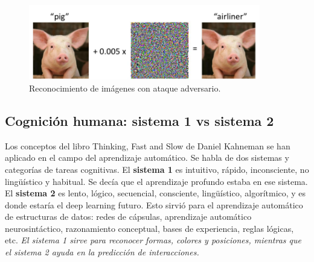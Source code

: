 \begin{figure}[htbp]
\centering
\includegraphics[width = 0.9\textwidth]{figs/pig-ai.png}
\caption{Reconocimiento de imágenes con ataque adversario.}
\label{fig:pig}
\end{figure}

\subsection{Cognición humana: sistema 1 vs sistema 2}
Los conceptos del libro Thinking, Fast and Slow de Daniel Kahneman se han aplicado en el campo del aprendizaje automático. Se habla de dos sistemas y categorías de tareas cognitivas. El \textbf{sistema 1} es intuitivo, rápido, inconsciente, no lingüístico y habitual. Se decía que el aprendizaje profundo estaba en ese sistema. El \textbf{sistema 2} es lento, lógico, secuencial, consciente, lingüístico, algorítmico, y es donde estaría el deep learning futuro. Esto sirvió para el aprendizaje automático de estructuras de datos: redes de cápsulas, aprendizaje automático neurosintáctico, razonamiento conceptual, bases de experiencia, reglas lógicas, etc. \textit{El sistema 1 sirve para reconocer formas, colores y posiciones, mientras que el sistema 2 ayuda en la predicción de interacciones.}

